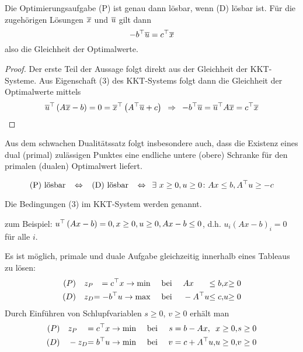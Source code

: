 \begin{satz} %
	Die Optimierungsaufgabe (P) ist genau dann lösbar, wenn (D) lösbar ist. Für die zugehörigen Lösungen $\overline{x}$ und $\overline{u}$ gilt dann
	\begin{equation*}
		- b^{\top} \overline{u} = c^{\top} \overline{x}
	\end{equation*}
	also die Gleichheit der Optimalwerte.
\end{satz}
\begin{proof}
	Der erste Teil der Aussage folgt direkt aus der Gleichheit der KKT-Systeme. Aus Eigenschaft (3) des KKT-Systems folgt dann die Gleichheit der Optimalwerte mittels
	\begin{equation*}
		\overline{u}^{\top} \left( A \overline{x} - b \right) = 0 = \overline{x}^{\top} \left( A^{\top} \overline{u} + c \right) \enskip \Rightarrow \enskip - b^{\top} \overline{u} = \overline{u}^{\top} A \overline{x} = c^{\top} \overline{x}
	\end{equation*}
\end{proof}

Aus dem schwachen Dualitätssatz folgt insbesondere auch, dass die Existenz eines dual (primal) zulässigen Punktes eine endliche untere (obere) Schranke für den primalen (dualen) Optimalwert liefert.

\begin{folgerung} %
	\begin{equation*}
		\text{(P) lösbar } \enskip \Leftrightarrow \enskip \text{ (D) lösbar } \enskip \Leftrightarrow \enskip \exists \ x \ge 0, u \ge 0 \colon Ax \le b, A^{\top} u \ge -c
	\end{equation*}
\end{folgerung}

Die Bedingungen (3) im KKT-System werden  genannt.

zum Beispiel: $u^{\top} \left( Ax - b \right) = 0, x \ge 0, u \ge 0,  Ax - b \le 0$, d.h. $u_i (Ax - b)_i = 0$ für alle $i$.

Es ist möglich, primale und duale Aufgabe gleichzeitig innerhalb eines Tableaus zu lösen:
\begin{equation*}
	\begin{alignedat}{4}
		(P) \quad &z_P &=   c^{\top} x \to \min \quad  &\text{ bei } \quad          A x &\le b, &x &\ge 0 \\
		(D) \quad &z_D &= - b^{\top} u \to \max \quad &\text{ bei } \quad - A^{\top} u &\le c, &u &\ge 0
	\end{alignedat}
\end{equation*}
Durch Einführen von Schlupfvariablen $s \ge 0$, $v \ge0$ erhält man
\begin{equation*}
	\begin{alignedat}{5}
		(P) \quad &   z_P &= c^{\top} x \to \min \quad &\text{ bei } \quad &s &= b - Ax, &x &\ge 0, &s &\ge 0 \\
		(D) \quad & - z_D &= b^{\top} u \to \min \quad &\text{ bei } \quad &v &= c + A^{\top} u, &u &\ge 0, &v &\ge 0
	\end{alignedat}
\end{equation*}

